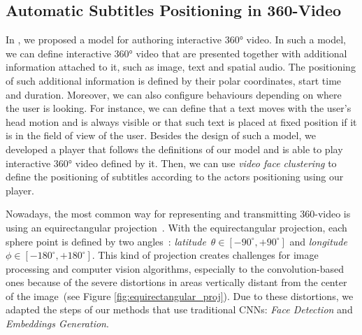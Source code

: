 \subsection{Automatic Subtitles Positioning in 360-Video}

In \cite{mendes2020authoring}, we proposed a model for authoring interactive 360° video. In such a model, we can define interactive 360° video that are presented together with additional information attached to it, such as image, text and spatial audio. The positioning of such additional information is defined by their polar coordinates, start time and duration. Moreover, we can also configure behaviours depending on where the user is looking. For instance, we can define that a text moves with the user's head motion and is always visible or that such text is placed at fixed position if it is in the field of view of the user. Besides the design of such a model, we developed a player that follows the definitions of our model and is able to play interactive 360° video defined by it. Then, we can use \emph{video face clustering} to define the positioning of subtitles according to the actors positioning using our player.

Nowadays, the most common way for representing and transmitting 360-video is using an equirectangular projection~\cite{yang2018object}. With the equirectangular projection, each sphere point is defined by two angles~\cite{snyder1987map}: \emph{latitude}~$\theta \in [-90^{\circ}, +90^{\circ}]$ and \emph{longitude}~$\phi \in [-180^{\circ}, +180^{\circ}]$. This kind of projection creates challenges for image processing and computer vision algorithms, especially to the convolution-based ones because of the severe distortions in areas vertically distant from the center of the image~(see Figure \ref{fig:equirectangular_proj}). Due to these distortions, we adapted the steps of our methods that use traditional CNNs: \emph{Face Detection} and \emph{Embeddings Generation}.

